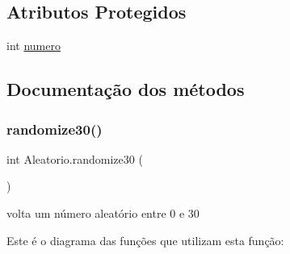 \subsection*{Atributos Protegidos}
\begin{DoxyCompactItemize}
\item 
int \mbox{\hyperlink{class_aleatorio_acc3b21dccd4a3bea8092b53b53ff1ae7}{numero}}
\end{DoxyCompactItemize}


\subsection{Documentação dos métodos}
\mbox{\label{class_aleatorio_abe19d3fdd490cbe1c2122c1ac3fde341}} 
\subsubsection{\texorpdfstring{randomize30()}{randomize30()}}
{\footnotesize\ttfamily int Aleatorio.\+randomize30 (\begin{DoxyParamCaption}{ }\end{DoxyParamCaption})}



volta um número aleatório entre 0 e 30 

Este é o diagrama das funções que utilizam esta função\+:
